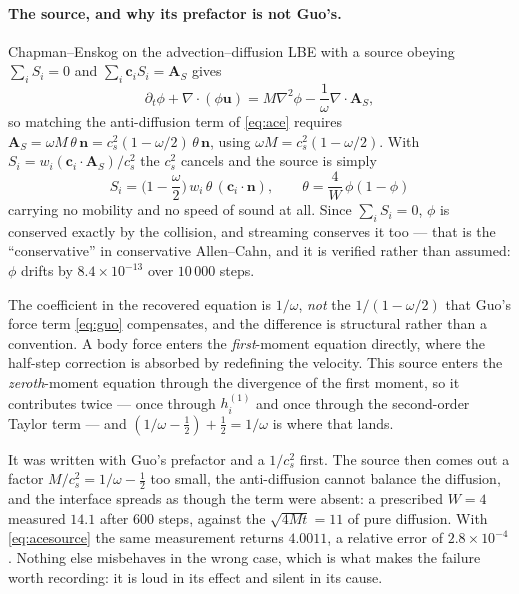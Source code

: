 \documentclass[11pt,a4paper]{article}
\newcommand{\cs}{c_s}
\newcommand{\ci}{\bm{c}_i}
\newcommand{\uu}{\bm{u}}
\newcommand{\nn}{\bm{n}}
\newcommand{\e}[1]{\times 10^{#1}}
\begin{document}
\paragraph{The source, and why its prefactor is not Guo's.} Chapman--Enskog on
the advection--diffusion LBE with a source obeying $\sum_i S_i = 0$ and
$\sum_i \ci S_i = \bm{A}_S$ gives
\begin{equation}
  \partial_t\phi + \nabla\!\cdot(\phi\uu)
    = M\nabla^2\phi - \frac{1}{\omega}\nabla\!\cdot\bm{A}_S ,
\end{equation}
so matching the anti-diffusion term of \eqref{eq:ace} requires
$\bm{A}_S = \omega M\,\theta\,\nn = \cs^2(1-\omega/2)\,\theta\,\nn$, using
$\omega M = \cs^2(1-\omega/2)$. With $S_i = w_i(\ci\!\cdot\!\bm{A}_S)/\cs^2$ the
$\cs^2$ cancels and the source is simply
\begin{equation}
  \boxed{\;
  S_i = \Big(1-\frac{\omega}{2}\Big)\,w_i\,\theta\,(\ci\!\cdot\!\nn),
  \qquad \theta = \frac{4}{W}\,\phi(1-\phi) \;}
  \label{eq:acesource}
\end{equation}
carrying no mobility and no speed of sound at all. Since $\sum_i S_i = 0$, $\phi$
is conserved exactly by the collision, and streaming conserves it too --- that
is the ``conservative'' in conservative Allen--Cahn, and it is verified rather
than assumed: $\phi$ drifts by $8.4\e{-13}$ over $10\,000$ steps.

The coefficient in the recovered equation is $1/\omega$, \emph{not} the
$1/(1-\omega/2)$ that Guo's force term \eqref{eq:guo} compensates, and the
difference is structural rather than a convention. A body force enters the
\emph{first}-moment equation directly, where the half-step correction is
absorbed by redefining the velocity. This source enters the \emph{zeroth}-moment
equation through the divergence of the first moment, so it contributes twice ---
once through $h_i^{(1)}$ and once through the second-order Taylor term --- and
$(1/\omega - \tfrac12) + \tfrac12 = 1/\omega$ is where that lands.

It was written with Guo's prefactor and a $1/\cs^2$ first. The source then comes
out a factor $M/\cs^2 = 1/\omega - \tfrac12$ too small, the anti-diffusion cannot
balance the diffusion, and the interface spreads as though the term were absent:
a prescribed $W=4$ measured $14.1$ after 600 steps, against the $\sqrt{4Mt}=11$
of pure diffusion. With \eqref{eq:acesource} the same measurement returns
$4.0011$, a relative error of $2.8\e{-4}$. Nothing else misbehaves in the wrong
case, which is what makes the failure worth recording: it is loud in its effect
and silent in its cause.
\end{document}
